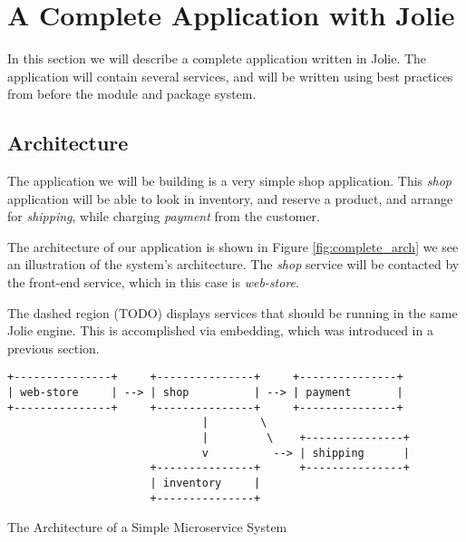 \section{A Complete Application with Jolie}

In this section we will describe a complete application written in Jolie. The
application will contain several services, and will be written using best
practices from before the module and package system.

\subsection{Architecture}

%

The application we will be building is a very simple shop application. This
\emph{shop} application will be able to look in inventory, and reserve a
product, and arrange for \emph{shipping}, while charging \emph{payment} from
the customer.

The architecture of our application is shown in Figure \ref{fig:complete_arch}
we see an illustration of the system's architecture. The \emph{shop} service
will be contacted by the front-end service, which in this case is
\emph{web-store}.

The dashed region (TODO) displays services that should be running in the same
Jolie engine. This is accomplished via embedding, which was introduced in a
previous section.

\begin{listing}[H]
\begin{verbatim}
+---------------+     +---------------+     +---------------+
| web-store     | --> | shop          | --> | payment       |
+---------------+     +---------------+     +---------------+
                              |        \
                              |         \    +---------------+
                              v          --> | shipping      |
                      +---------------+      +---------------+
                      | inventory     |
                      +---------------+
\end{verbatim}
\caption{The Architecture of a Simple Microservice System}
\label{fig:complete_arch}
\end{listing}


